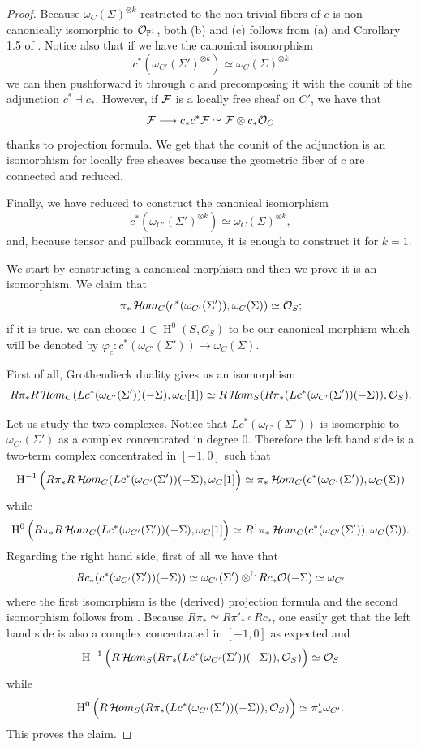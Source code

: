 \documentclass{alggeom}
\numberwithin{equation}{section}
\numberwithin{subsection}{section}
\theoremstyle{definition}
\theoremstyle{remark}
\newcommand\cO{\mathcal{O}} \newcommand\cP{\mathcal{P}}
\renewcommand\H{\operatorname{H}}
\newcommand\curshom{\mathop{\mathcal{H}\hskip -.8pt om}\nolimits}
\begin{document}
\begin{proof}
 Because $\omega_{C}(\Sigma)^{\otimes k}$ restricted to the non-trivial fibers of $c$ is non-canonically isomorphic to $\cO_{\PP^1}$, both (b) and (c) follows from (a) and Corollary 1.5 of \cite{Knu}. Notice also that if we have the canonical isomorphism 
 $$ c^*(\omega_{C'}(\Sigma')^{\otimes k}) \simeq \omega_{C}(\Sigma)^{\otimes k}$$
 we can then pushforward it through $c$ and precomposing it with the counit of the adjunction $c^* \dashv c_*$. However, if $\mathcal{F}$ is a locally free sheaf on $C'$, we have that 
 $$ \cF \longrightarrow c_*c^*\cF\simeq \cF \otimes c_*\cO_C$$ 
 thanks to projection formula. We get that the counit of the adjunction is an isomorphism for locally free sheaves because the geometric fiber of $c$ are connected and reduced. 
 
 Finally, we have reduced to construct the canonical isomorphism 
 $$c^*(\omega_{C'}(\Sigma')^{\otimes k}) \simeq \omega_{C}(\Sigma)^{\otimes k},$$
 and, because tensor and pullback commute, it is enough to construct it for $k=1$. 
 
 We start by constructing a canonical morphism and then we prove it is an isomorphism. We claim that 
 $$ \pi_*\curshom_C(c^*(\omega_{C'}(\Sigma')),\omega_{C}(\Sigma)) \simeq \cO_S;$$ 
 if it is true, we can choose $1 \in \H^0(S,\cO_S)$ to be our canonical morphism which will be denoted by $\varphi_c:c^*(\omega_{C'}(\Sigma'))\rightarrow \omega_{C}(\Sigma)$. 
 
 First of all, Grothendieck duality gives us an isomorphism  
 $$ R\pi_*R\curshom_C(Lc^*(\omega_{C'}(\Sigma'))(-\Sigma),\omega_{C}[1]) \simeq R\curshom_S(R\pi_*(Lc^*(\omega_{C'}(\Sigma'))(-\Sigma)),\cO_S).$$
 
 Let us study the two complexes. Notice that $Lc^*(\omega_{C'}(\Sigma'))$ is isomorphic to $\omega_{C'}(\Sigma')$ as a complex concentrated in degree $0$. Therefore the left hand side is a two-term complex concentrated in $[-1,0]$ such that 
  $$\H^{-1}\Big(R\pi_*R\curshom_C(Lc^*(\omega_{C'}(\Sigma'))(-\Sigma),\omega_{C}[1]\Big)\simeq \pi_*\curshom_C(c^*(\omega_{C'}(\Sigma')),\omega_{C}(\Sigma))$$ 
 while 
  $$ \H^0\Big(R\pi_*R\curshom_C(Lc^*(\omega_{C'}(\Sigma'))(-\Sigma),\omega_{C}[1]\Big) \simeq R^1\pi_*\curshom_C(c^*(\omega_{C'}(\Sigma')),\omega_{C}(\Sigma)).$$
Regarding the right hand side, first of all we have that 
  $$Rc_*(c^*(\omega_{C'}(\Sigma'))(-\Sigma)) \simeq \omega_{C'}(\Sigma') \otimes^{\LL} Rc_*\cO(-\Sigma) \simeq \omega_{C'}$$
  where the first isomorphism is the (derived) projection formula and the second isomorphism follows from . Because $R\pi_*\simeq R\pi'_* \circ Rc_*$, one easily get that the left hand side is also a complex concentrated in $[-1,0]$ as expected and
  $$ \H^{-1}\Big(R\curshom_S(R\pi_*(Lc^*(\omega_{C'}(\Sigma'))(-\Sigma)),\cO_S)\Big) \simeq \cO_S$$
  while 
  $$ \H^{0}\Big(R\curshom_S(R\pi_*(Lc^*(\omega_{C'}(\Sigma'))(-\Sigma)),\cO_S)\Big) \simeq \pi'_*\omega_{C'}.$$
  This proves the claim. 
  

\end{proof}
\end{document}
